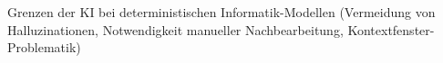 
Grenzen der KI bei deterministischen Informatik-Modellen (Vermeidung von Halluzinationen, Notwendigkeit manueller Nachbearbeitung, Kontextfenster-Problematik)